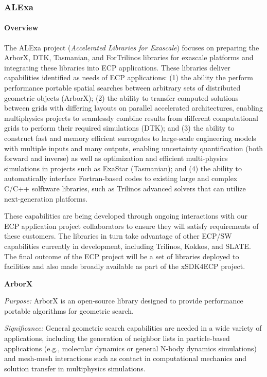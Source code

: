 \subsubsection{ ALExa}


\paragraph{Overview}

The ALExa project ({\sl Accelerated Libraries for Exascale}) focuses on
preparing the ArborX, DTK, Tasmanian, and ForTrilinos libraries for exascale
platforms and integrating these libraries into ECP applications.
These libraries deliver capabilities identified as needs of ECP applications:
%
(1) the ability the perform performance portable spatial searches between
arbitrary sets of distributed geometric objects (ArborX);
%
(2) the ability to transfer computed
solutions between grids with differing layouts on parallel accelerated
architectures, enabling multiphysics projects to seamlessly combine results
from different computational grids to perform their required simulations
(DTK); and
%
(3) the ability to construct fast and memory efficient surrogates to 
large-scale engineering models with multiple inputs and many outputs,
enabling uncertainty quantification (both forward and inverse) as well as
optimization and efficient multi-physics simulations in projects such as
ExaStar (Tasmanian); and
%
(4) the ability to automatically interface Fortran-based codes to existing
large and complex C/C++ solftware libraries, such as Trilinos advanced solvers
that can utilize next-generation platforms.


These capabilities are being developed through ongoing interactions with our
ECP application project collaborators to ensure they will satisfy requirements
of these customers.  The libraries in turn take advantage of other ECP/SW
capabilities currently in development, including Trilinos,
Kokkos, and SLATE.  The final outcome of the ECP project will be a set of
libraries deployed to facilities and also made broadly available as part of
the xSDK4ECP project.


{\bf ArborX}

{\it Purpose:} ArborX is an open-source library designed to provide
performance portable algorithms for geometric search.

{\it Significance:} General geometric search capabilities are needed in a wide
variety of applications, including the generation of neighbor lists in
particle-based applications (e.g., molecular dynamics or general N-body
dynamics simulations) and mesh-mesh interactions such as contact in
computational mechanics and solution transfer in multiphysics simulations.

